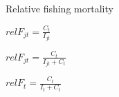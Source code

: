 \documentclass[12pt, a4paper]{article}
\date{}
\begin{document}
\indent Relative fishing mortality 

$relF_{jt}=\frac{C_{t}}{I_{jt}}$\\ 

\vspace{1cm}

$relF_{jt}=\frac{C_{t}}{I_{jt}+C_{t}}$\\

\vspace{1cm}

$relF_{t}=\frac{C_{t}}{I_{t}+C_{t}}$\\
\end{document}
